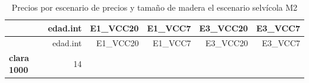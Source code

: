 \documentclass[]{article}
\begin{document}
\begin{longtable}[]{@{}lrrrrr@{}}
\caption{Precios por escenario de precios y tamaño de madera el
escenario selvícola M2}\tabularnewline
\toprule
\begin{minipage}[b]{0.21\columnwidth}\raggedright\strut
~\strut
\end{minipage} & \begin{minipage}[b]{0.13\columnwidth}\raggedleft\strut
edad.int\strut
\end{minipage} & \begin{minipage}[b]{0.13\columnwidth}\raggedleft\strut
E1\_VCC20\strut
\end{minipage} & \begin{minipage}[b]{0.12\columnwidth}\raggedleft\strut
E1\_VCC7\strut
\end{minipage} & \begin{minipage}[b]{0.13\columnwidth}\raggedleft\strut
E3\_VCC20\strut
\end{minipage} & \begin{minipage}[b]{0.13\columnwidth}\raggedleft\strut
E3\_VCC7\strut
\end{minipage}\tabularnewline
\midrule
\endfirsthead
\toprule
\begin{minipage}[b]{0.21\columnwidth}\raggedright\strut
~\strut
\end{minipage} & \begin{minipage}[b]{0.13\columnwidth}\raggedleft\strut
edad.int\strut
\end{minipage} & \begin{minipage}[b]{0.13\columnwidth}\raggedleft\strut
E1\_VCC20\strut
\end{minipage} & \begin{minipage}[b]{0.12\columnwidth}\raggedleft\strut
E1\_VCC7\strut
\end{minipage} & \begin{minipage}[b]{0.13\columnwidth}\raggedleft\strut
E3\_VCC20\strut
\end{minipage} & \begin{minipage}[b]{0.13\columnwidth}\raggedleft\strut
E3\_VCC7\strut
\end{minipage}\tabularnewline
\midrule
\endhead
\begin{minipage}[t]{0.21\columnwidth}\raggedright\strut
\textbf{clara 1000}\strut
\end{minipage} & \begin{minipage}[t]{0.13\columnwidth}\raggedleft\strut
14\strut
\end{minipage} & \begin{minipage}[t]{0.13\columnwidth}\raggedleft\strut

\end{minipage}
\end{longtable}
\end{document}
